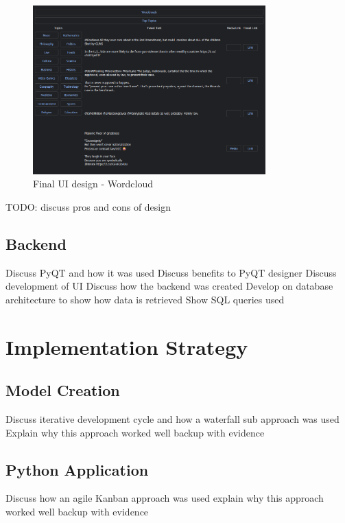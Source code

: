 \begin{figure}[h]
    \centering
    \includegraphics[width=0.8\textwidth]{../images/UI-dark-1-ft.png}
    \caption{Final UI design - Wordcloud}
    \label{fig:ui-findtopics}
\end{figure}

TODO: discuss pros and cons of design

\subsection{Backend}
Discuss PyQT and how it was used
Discuss benefits to PyQT designer
Discuss development of UI
Discuss how the backend was created
Develop on database architecture to show how data is retrieved
Show SQL queries used
\section{Implementation Strategy}
\subsection{Model Creation}
Discuss iterative development cycle and how a waterfall sub approach was used
Explain why this approach worked well
backup with evidence
\subsection{Python Application}
Discuss how an agile Kanban approach was used
explain why this approach worked well
backup with evidence